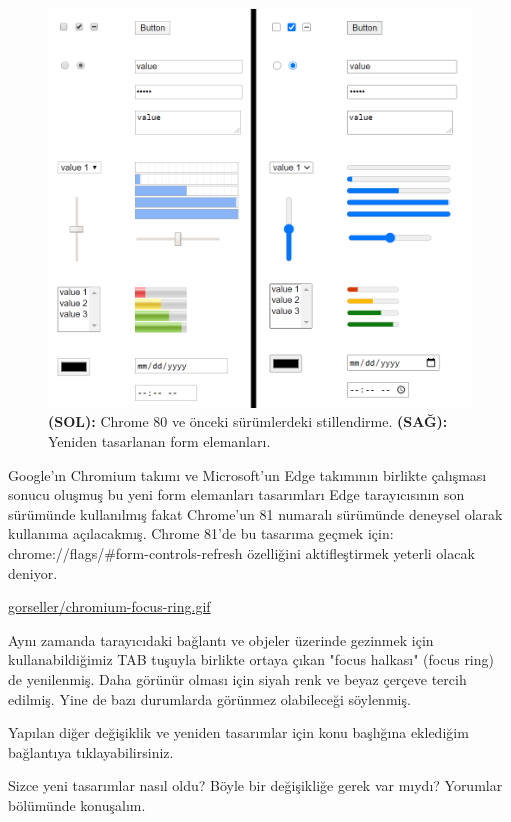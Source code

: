 \documentclass[11pt]{article}
\begin{document}
\begin{figure}[htbp]
\centering
\includegraphics[width=.9\linewidth]{gorseller/chromium-form-eski-yeni.png}
\caption[\textbf{(SOL):} \textbf{(SAĞ):}]{\textbf{(SOL):} Chrome 80 ve önceki sürümlerdeki stillendirme. \textbf{(SAĞ):} Yeniden tasarlanan form elemanları.}
\end{figure}

Google'ın Chromium takımı ve Microsoft'un Edge takımının birlikte çalışması
sonucu oluşmuş bu yeni form elemanları tasarımları Edge tarayıcısının son
sürümünde kullanılmış fakat Chrome'un 81 numaralı sürümünde deneysel olarak
kullanıma açılacakmış. Chrome 81'de bu tasarıma geçmek için:
chrome://flags/\#form-controls-refresh özelliğini aktifleştirmek yeterli olacak
deniyor.

\url{gorseller/chromium-focus-ring.gif}

Aynı zamanda tarayıcıdaki bağlantı ve objeler üzerinde gezinmek için
kullanabildiğimiz TAB tuşuyla birlikte ortaya çıkan "focus halkası" (focus
ring) de yenilenmiş. Daha görünür olması için siyah renk ve beyaz çerçeve
tercih edilmiş. Yine de bazı durumlarda görünmez olabileceği söylenmiş.

Yapılan diğer değişiklik ve yeniden tasarımlar için konu başlığına eklediğim
bağlantıya tıklayabilirsiniz.

Sizce yeni tasarımlar nasıl oldu? Böyle bir değişikliğe gerek var mıydı?
Yorumlar bölümünde konuşalım.
\end{document}
